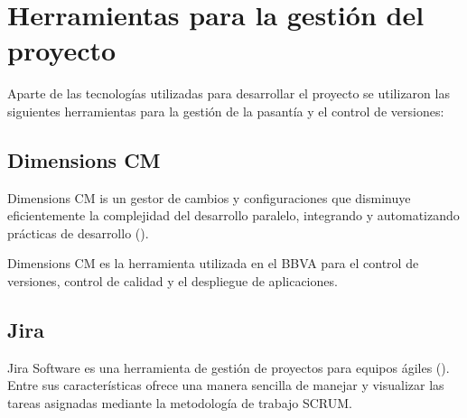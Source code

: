 \section{Herramientas para la gestión del proyecto}

Aparte de las tecnologías utilizadas para desarrollar el proyecto se utilizaron
las siguientes herramientas para la gestión de la pasantía y el control de versiones:

\subsection{Dimensions CM}

Dimensions CM is un gestor de cambios y configuraciones que disminuye eficientemente
la complejidad del desarrollo paralelo, integrando y automatizando prácticas de desarrollo
(\cite{DIMENSIONS}).

Dimensions CM es la herramienta utilizada en el BBVA para el control de versiones, control de
calidad y el despliegue de aplicaciones.

\subsection{Jira}

Jira Software es una herramienta de gestión de proyectos para equipos ágiles (\cite{JIRA}).
Entre sus características ofrece una manera sencilla de manejar y visualizar
las tareas asignadas mediante la metodología de trabajo SCRUM.
